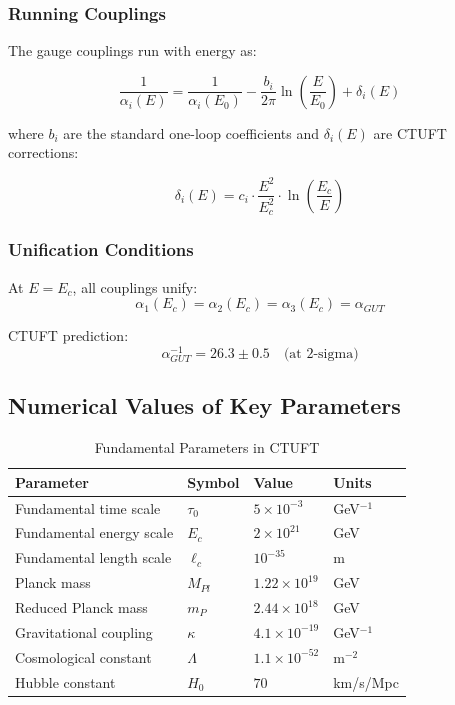 \subsubsection{Running Couplings}

The gauge couplings run with energy as:

\begin{equation}
    \frac{1}{\alpha_i(E)} = \frac{1}{\alpha_i(E_0)} - \frac{b_i}{2\pi}\ln\left(\frac{E}{E_0}\right) + \delta_i(E)
\end{equation}

where $b_i$ are the standard one-loop coefficients and $\delta_i(E)$ are CTUFT corrections:

\begin{equation}
    \delta_i(E) = c_i \cdot \frac{E^2}{E_c^2} \cdot \ln\left(\frac{E_c}{E}\right)
\end{equation}

\subsubsection{Unification Conditions}

At $E = E_c$, all couplings unify:
\begin{equation}
    \alpha_1(E_c) = \alpha_2(E_c) = \alpha_3(E_c) = \alpha_{GUT}
\end{equation}

CTUFT prediction:
\begin{equation}
    \alpha_{GUT}^{-1} = 26.3 \pm 0.5 \quad \text{(at 2-sigma)}
\end{equation}

\subsection{Numerical Values of Key Parameters}

\begin{table}[htbp]
\centering
\caption{Fundamental Parameters in CTUFT}
\begin{tabular}{@{}llll@{}}
\toprule
\textbf{Parameter} & \textbf{Symbol} & \textbf{Value} & \textbf{Units} \\
\midrule
Fundamental time scale & $\tau_0$ & $5 \times 10^{-3}$ & GeV$^{-1}$ \\
Fundamental energy scale & $E_c$ & $2 \times 10^{21}$ & GeV \\
Fundamental length scale & $\ell_c$ & $10^{-35}$ & m \\
Planck mass & $M_{Pl}$ & $1.22 \times 10^{19}$ & GeV \\
Reduced Planck mass & $m_P$ & $2.44 \times 10^{18}$ & GeV \\
Gravitational coupling & $\kappa$ & $4.1 \times 10^{-19}$ & GeV$^{-1}$ \\
Cosmological constant & $\Lambda$ & $1.1 \times 10^{-52}$ & m$^{-2}$ \\
Hubble constant & $H_0$ & $70$ & km/s/Mpc \\
\bottomrule
\end{tabular}
\label{tab:fundamental_params}
\end{table}

